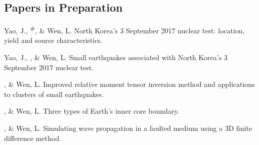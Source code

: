 \subsection*{Papers in Preparation}
\begin{etaremune}
\item
    Yao, J., \Tian\textsuperscript{\#}, \& Wen, L.
	North Korea's 3 September 2017 nuclear test: location, yield and source characteristics.
\item
    Yao, J., \Tian, \& Wen, L.
	Small earthquakes associated with North Korea's 3 September 2017 nuclear test.
\item
    \Tian, \& Wen, L.
    Improved relative moment tensor inversion method and applications to clusters of small earthquakes.
\item
    \Tian, \& Wen, L.
    Three types of Earth's inner core boundary.
\item
    \Tian, \& Wen, L.
    Simulating wave propagation in a faulted medium using a 3D finite difference method.
\end{etaremune}
